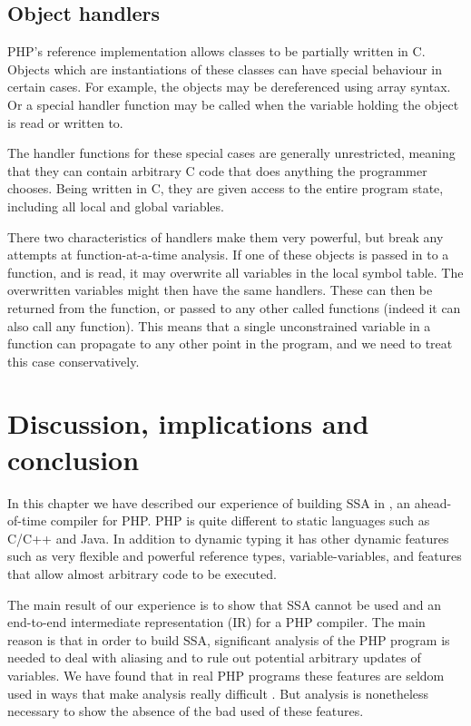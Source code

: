 \subsection{Object handlers}
PHP's reference implementation allows classes to be partially written
in C.  Objects which are instantiations of these classes can have
special behaviour in certain cases.  For example, the objects may be
dereferenced using array syntax. Or a special handler function may be
called when the variable holding the object is read or written to.

The handler functions for these special cases are generally
unrestricted, meaning that they can contain arbitrary C code that does
anything the programmer chooses.  Being written in C, they are given
access to the entire program state, including all local and global
variables.

There two characteristics of handlers make them very powerful, but
break any attempts at function-at-a-time analysis.  If one of these
objects is passed in to a function, and is read, it may overwrite all
variables in the local symbol table.  The overwritten variables might
then have the same handlers.  These can then be returned from the
function, or passed to any other called functions (indeed it can also
call any function).  This means that a single unconstrained variable
in a function can propagate to any other point in the program, and we
need to treat this case conservatively.


\section{Discussion, implications and conclusion}
In this chapter we have described our experience of building SSA in
\phc, an ahead-of-time compiler for PHP. PHP is quite different to
static languages such as C/C++ and Java. In addition to
dynamic typing it has other dynamic features such as very flexible and
powerful reference types, variable-variables, and features that allow
almost arbitrary code to be executed.

The main result of our experience is to show that SSA cannot be used
and an end-to-end intermediate representation (IR) for a PHP
compiler. The main reason is that in order to build SSA, significant
analysis of the PHP program is needed to deal with aliasing and to
rule out potential arbitrary updates of variables. We have found that
in real PHP programs these features are seldom used in ways that make
analysis really difficult \cite{Biggar2010}. But analysis is
nonetheless necessary to show the absence of the bad used of these
features.

